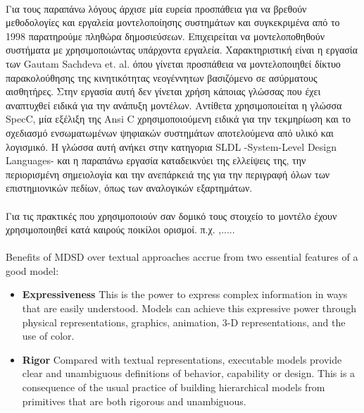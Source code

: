 \documentclass[a4paper,12pt,twoside]{report}
\begin{document}
{			
						
			\paragraph{} {Για τους παραπάνω λόγους άρχισε μία ευρεία προσπάθεια για να βρεθούν μεθοδολογίες και εργαλεία μοντελοποίησης συστημάτων και συγκεκριμένα από το 1998 παρατηρούμε πληθώρα δημοσιεύσεων. Επιχειρείται να μοντελοποθηθούν συστήματα με χρησιμοποιώντας υπάρχοντα εργαλεία. Χαρακτηριστική είναι η εργασία των Gautam Sachdeva et. al. \cite{SMWirelessSensorNetwork} όπου γίνεται προσπάθεια να μοντελοποιηθεί δίκτυο παρακολούθησης της κινητικότητας νεογέννητων βασιζόμενο σε ασύρματους αισθητήρες. Στην εργασία αυτή δεν γίνεται χρήση κάποιας γλώσσας που έχει αναπτυχθεί ειδικά για την ανάπυξη μοντέλων. Αντίθετα χρησιμοποιείται η γλώσσα SpecC, μία εξέλιξη της Ansi C χρησιμοποιούμενη ειδικά για την τεκμηρίωση και το σχεδιασμό ενσωματωμένων ψηφιακών συστημάτων αποτελούμενα από υλικό και λογισμικό. Η γλώσσα αυτή ανήκει στην κατηγορια SLDL -System-Level Design Languages- και η παραπάνω εργασία καταδεικνύει της ελλείψεις της, την περιορισμένη σημειολογία και την ανεπάρκειά της για την περιγραφή όλων των επιστημιονικών πεδίων, όπως των αναλογικών εξαρτημάτων.
			}
			
			\paragraph{} {Για τις πρακτικές που χρησιμοποιούν σαν δομικό τους στοιχείο το μοντέλο έχουν χρησιμοποιηθεί κατά καιρούς ποικίλοι ορισμοί. π.χ.  \cite{FoundationalConceptsMDSD},.....
			}
			
			\paragraph{} {Benefits of MDSD over textual approaches accrue from two essential features of a good model: \cite{FoundationalConceptsMDSD}}
			\begin{itemize}
				\item \textbf{Expressiveness} This is the power to express complex information in ways that are easily understood. Models can achieve this expressive power through physical representations, graphics, animation, 3-D representations, and the use of color. 
				\item \textbf{Rigor} Compared with textual representations, executable models provide clear and unambiguous definitions of behavior, capability or design. This is a consequence of the usual practice of building hierarchical models from primitives that are both rigorous and unambiguous.
			\end{itemize}
			
}
\end{document}
